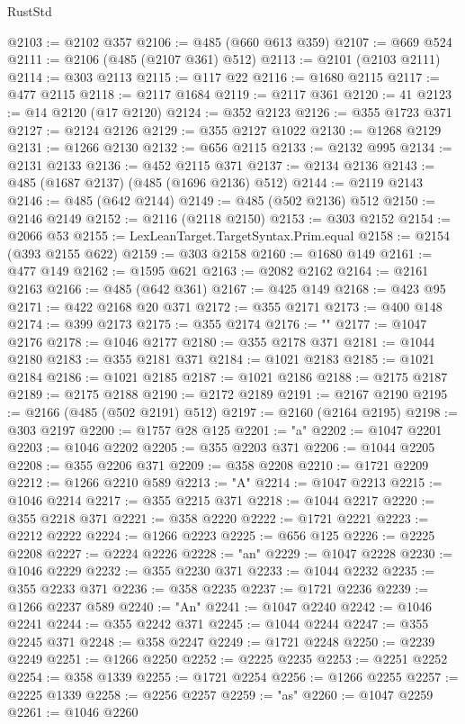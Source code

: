 \begin{lexlean}{RustStd}
\begin{coremodule}
@2103 := @2102 @357
@2106 := @485 (@660 @613 @359)
@2107 := @669 @524
@2111 := @2106 (@485 (@2107 @361) @512)
@2113 := @2101 (@2103 @2111)
@2114 := @303 @2113
@2115 := @117 @22
@2116 := @1680 @2115
@2117 := @477 @2115
@2118 := @2117 @1684
@2119 := @2117 @361
@2120 := 41
@2123 := @14 @2120 (@17 @2120)
@2124 := @352 @2123
@2126 := @355 @1723 @371
@2127 := @2124 @2126
@2129 := @355 @2127 @1022
@2130 := @1268 @2129
@2131 := @1266 @2130
@2132 := @656 @2115
@2133 := @2132 @995
@2134 := @2131 @2133
@2136 := @452 @2115 @371
@2137 := @2134 @2136
@2143 := @485 (@1687 @2137) (@485 (@1696 @2136) @512)
@2144 := @2119 @2143
@2146 := @485 (@642 @2144)
@2149 := @485 (@502 @2136) @512
@2150 := @2146 @2149
@2152 := @2116 (@2118 @2150)
@2153 := @303 @2152
@2154 := @2066 @53
@2155 := LexLeanTarget.TargetSyntax.Prim.equal
@2158 := @2154 (@393 @2155 @622)
@2159 := @303 @2158
@2160 := @1680 @149
@2161 := @477 @149
@2162 := @1595 @621
@2163 := @2082 @2162
@2164 := @2161 @2163
@2166 := @485 (@642 @361)
@2167 := @425 @149
@2168 := @423 @95
@2171 := @422 @2168 @20 @371
@2172 := @355 @2171
@2173 := @400 @148
@2174 := @399 @2173
@2175 := @355 @2174
@2176 := ""
@2177 := @1047 @2176
@2178 := @1046 @2177
@2180 := @355 @2178 @371
@2181 := @1044 @2180
@2183 := @355 @2181 @371
@2184 := @1021 @2183
@2185 := @1021 @2184
@2186 := @1021 @2185
@2187 := @1021 @2186
@2188 := @2175 @2187
@2189 := @2175 @2188
@2190 := @2172 @2189
@2191 := @2167 @2190
@2195 := @2166 (@485 (@502 @2191) @512)
@2197 := @2160 (@2164 @2195)
@2198 := @303 @2197
@2200 := @1757 @28 @125
@2201 := "a"
@2202 := @1047 @2201
@2203 := @1046 @2202
@2205 := @355 @2203 @371
@2206 := @1044 @2205
@2208 := @355 @2206 @371
@2209 := @358 @2208
@2210 := @1721 @2209
@2212 := @1266 @2210 @589
@2213 := "A"
@2214 := @1047 @2213
@2215 := @1046 @2214
@2217 := @355 @2215 @371
@2218 := @1044 @2217
@2220 := @355 @2218 @371
@2221 := @358 @2220
@2222 := @1721 @2221
@2223 := @2212 @2222
@2224 := @1266 @2223
@2225 := @656 @125
@2226 := @2225 @2208
@2227 := @2224 @2226
@2228 := "an"
@2229 := @1047 @2228
@2230 := @1046 @2229
@2232 := @355 @2230 @371
@2233 := @1044 @2232
@2235 := @355 @2233 @371
@2236 := @358 @2235
@2237 := @1721 @2236
@2239 := @1266 @2237 @589
@2240 := "An"
@2241 := @1047 @2240
@2242 := @1046 @2241
@2244 := @355 @2242 @371
@2245 := @1044 @2244
@2247 := @355 @2245 @371
@2248 := @358 @2247
@2249 := @1721 @2248
@2250 := @2239 @2249
@2251 := @1266 @2250
@2252 := @2225 @2235
@2253 := @2251 @2252
@2254 := @358 @1339
@2255 := @1721 @2254
@2256 := @1266 @2255
@2257 := @2225 @1339
@2258 := @2256 @2257
@2259 := "as"
@2260 := @1047 @2259
@2261 := @1046 @2260

\end{coremodule}
\end{lexlean}
